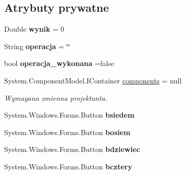 \subsection*{Atrybuty prywatne}
\begin{DoxyCompactItemize}
\item 
\mbox{\label{classkalku__all__in__one_1_1_kalkulator_a3076a6e9bc1a3631a61d61a02a169555}} 
Double {\bfseries wynik} = 0
\item 
\mbox{\label{classkalku__all__in__one_1_1_kalkulator_a27a890d894854bfa3dd89f4717570191}} 
String {\bfseries operacja} = \char`\"{}\char`\"{}
\item 
\mbox{\label{classkalku__all__in__one_1_1_kalkulator_a5fda389d4250085d2cef5997b42a5aee}} 
bool {\bfseries operacja\+\_\+wykonana} =false
\item 
System.\+Component\+Model.\+I\+Container \mbox{\hyperlink{classkalku__all__in__one_1_1_kalkulator_a1715a33d70720ecdb66997bc7f5705ff}{components}} = null
\begin{DoxyCompactList}\small\item\em Wymagana zmienna projektanta. \end{DoxyCompactList}\item 
\mbox{\label{classkalku__all__in__one_1_1_kalkulator_a03f7a30e028760a997ac0d322c9d1a65}} 
System.\+Windows.\+Forms.\+Button {\bfseries bsiedem}
\item 
\mbox{\label{classkalku__all__in__one_1_1_kalkulator_a8f308326b20f2510ec221aec17c83127}} 
System.\+Windows.\+Forms.\+Button {\bfseries bosiem}
\item 
\mbox{\label{classkalku__all__in__one_1_1_kalkulator_a40ff7599640e9fdc5f903f480e565ff8}} 
System.\+Windows.\+Forms.\+Button {\bfseries bdziewiec}
\item 
\mbox{\label{classkalku__all__in__one_1_1_kalkulator_a244aa6c62645cb566c8815d4838d90ae}} 
System.\+Windows.\+Forms.\+Button {\bfseries bcztery}
\item 

\end{DoxyCompactItemize}
